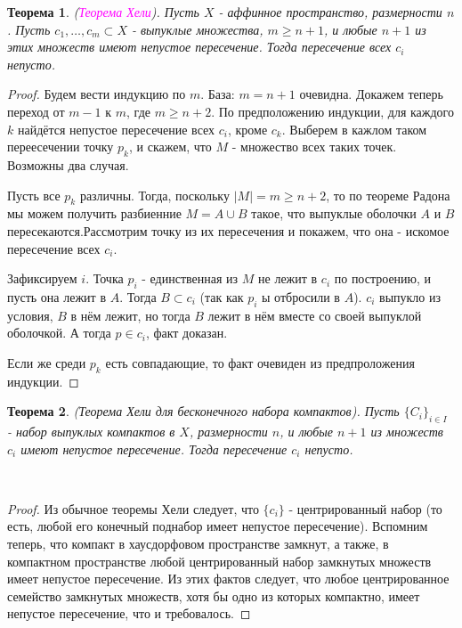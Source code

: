 \documentclass[a4paper,100pt]{article}
\theoremstyle{indented}
\newtheorem{theorem}{Теорема}
\theoremstyle{definition}
\theoremstyle{remark}
\begin{document}
\begin{theorem}
    (\textit{\textcolor{magenta}{\hypertarget{s94}{Теорема Хели}}}). Пусть $X$ - аффинное пространство, размерности $n$. Пусть $c_1, \ldots, c_m \subset X$ - выпуклые множества, $m \geq n+1$, и любые $n+1$ из этих множеств имеют непустое пересечение. Тогда пересечение всех $c_i$ непусто.
\end{theorem} 

\begin{proof}
    Будем вести индукцию по $m$. База: $m=n+1$ очевидна. Докажем теперь переход от $m-1$ к $m$, где $m \geq n+2$. По предположению индукции, для каждого $k$ найдётся непустое пересечение всех $c_i$, кроме $c_k$. Выберем в кажлом таком переесечении точку $p_k$, и скажем, что $M$ - множество всех таких точек. Возможны два случая. \ 
    
    Пусть все $p_k$ различны. Тогда, поскольку $|M| = m \geq n+2 $, то по теореме Радона мы можем получить разбиенние $M = A \cup B$ такое, что выпуклые оболочки $A$ и $B$ пересекаются.Рассмотрим точку из их пересечения и покажем, что она - искомое пересечение всех $c_i$. \ 
    
    Зафиксируем $i$. Точка $p_i$ - единственная из $M$ не лежит в $c_i$ по построению, и пусть она лежит в $A$. Тогда $B \subset c_i$ (так как $p_i$ ы отбросили в $A$). $c_i$ выпукло из условия, $B$ в нём лежит, но тогда $B$ лежит в нём вместе со своей выпуклой оболочкой. А тогда $p \in c_i$, факт доказан. \ 

    Если же среди $p_k$ есть совпадающие, то факт очевиден из предпроложения индукции.
\end{proof}

\begin{theorem}
    (Теорема Хели для бесконечного набора компактов). Пусть $\{C_i\}_{i \in I}$ - набор выпуклых компактов в $X$, размерности $n$, и любые $n+1$ из множеств $c_i$ имеют непустое пересечение. Тогда пересечение $c_i$ непусто.
\end{theorem} \

\begin{proof}
    Из обычное теоремы Хели следует, что $\{c_i\}$ - центрированный набор (то есть, любой его конечный поднабор имеет непустое пересечение). Вспомним теперь, что компакт в хаусдорфовом пространстве замкнут, а также, в компактном пространстве любой центрированный набор замкнутых множеств имеет непустое пересечение. Из этих фактов следует, что любое центрированное семейство замкнутых множеств, хотя бы одно из которых компактно, имеет непустое пересечение, что и требовалось.
\end{proof}
\end{document}
